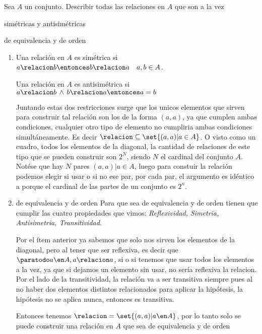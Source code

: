 \begin{enunciado}{\ejercicio}
  Sea $A$ un conjunto. Describir todas las relaciones en $A$ que son a la vez
  \begin{enumerate}[label=\roman*)]
    \begin{multicols}{2}
      \item simétricas y antisimétricas
      \item de equivalencia y de orden
    \end{multicols}
  \end{enumerate}
\end{enunciado}

\begin{enumerate}[label=\roman*)]
  \item
        Una relación en $A$ es simétrica si $a \relacion b \entonces b \relacion a \quad a,b \in A$.

        Una relación en $A$ es antisimétrica si $a \relacion b \, \land \, b \relacion a \entonces a = b$

        Juntando estas dos restricciones surge que los unicos elementos que sirven para construir tal relación son los de la forma
        $(a,a)$, ya que cumplen ambas condiciones, cualquier otro tipo de elemento no cumpliria ambas condiciones simultáneamente.
        Es decir $\relacion \subseteq \set{(a,a) | a \in A}$. O visto como un cuadro, todos los elementos de la diagonal, la cantidad
        de relaciones de este tipo que se pueden construir son $2^N$, siendo $N$ el cardinal del conjunto $A$. Notése que hay $N$ pares
        $(a,a) | a \in A$, luego para constuir la relación podemos elegir si usar o si no ese par, por cada par, el argumento es idéntico a porque
        el cardinal de las partes de un conjunto es $2^n$.

  \item de equivalencia y de orden
        Para que sea de equivalencia y de orden tienen que cumplir las cuatro propiedades que vimos: \textit{Reflexividad, Simetria, Antisimetria, Transitividad}.

       Por el ítem anterior ya sabemos que solo nos sirven los elementos de la diagonal,
        pero al tener que ser reflexiva, es decir que $\paratodo a \en A, a \relacion a$,
        si o si tenemos que usar todos los elementos a la vez, ya que si dejamos un elemento sin usar, no sería reflexiva la relacion.
        Por el lado de la transitividad, la relación va a ser transitiva siempre pues al no haber dos elementos distintos
        relacionados para aplicar la hipótesis, la hipótesis no se aplica nunca, entonces es transitiva.

        Entonces tenemos $\relacion = \set{(a,a) | a \en A}$, por lo tanto solo se puede construir una relación en $A$ que sea
        de equivalencia y de orden

\end{enumerate}

\begin{aportes}
  \item {}
\end{aportes}
